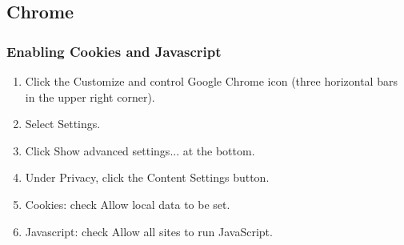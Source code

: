 \documentclass[hidelinks,english]{article}
\begin{document}
        \subsection{Chrome}
            \subsubsection{Enabling Cookies and Javascript}
            \begin{enumerate}
                \item Click the Customize and control Google Chrome icon (three horizontal bars in the upper right corner).
                \item Select Settings.
                \item Click Show advanced settings... at the bottom.
                \item Under Privacy, click the Content Settings button.
                \item Cookies: check Allow local data to be set.
                \item Javascript: check Allow all sites to run JavaScript.
            \end{enumerate}
            \begin{center}
            \end{center}
        \newpage
\end{document}

